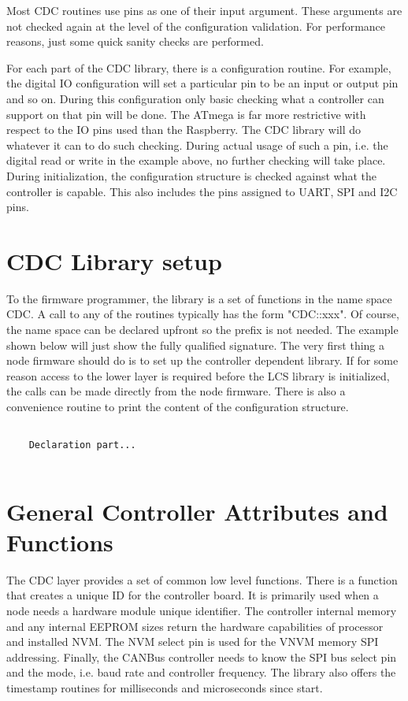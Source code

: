 Most CDC routines use pins as one of their input argument. These arguments are not checked again at the level of the configuration validation. For performance reasons, just some quick sanity checks are performed.

For each part of the CDC library, there is a configuration routine. For example, the digital IO configuration will set a particular pin to be an input or output pin and so on. During this configuration only basic checking what a controller can support on that pin will be done. The ATmega is far more restrictive with respect to the IO pins used than the Raspberry. The CDC library will do whatever it can to do such checking. During actual usage of such a pin, i.e. the digital read or write in the example above, no further checking will take place. During initialization, the configuration structure is checked against what the controller is capable. This also includes the pins assigned to UART, SPI and I2C pins.

\section{CDC Library setup}

To the firmware programmer, the library is a set of functions in the name space CDC. A call to any of the routines typically has the form "CDC::xxx". Of course, the name space can be declared upfront so the prefix is not needed. The example shown below will just show the fully qualified signature. The very first thing a node firmware should do is to set up the controller dependent library. If for some reason access to the lower layer is required before the LCS library is initialized, the calls can be made directly from the node firmware. There is also a convenience routine to print the content of the configuration structure.

\lstset{language=c++, style=codesnippetstyle}
\begin{lstlisting}
   
    Declaration part...
    
\end{lstlisting}
\FloatBarrier

\section{General Controller Attributes and Functions}

The CDC layer provides a set of common low level functions. There is a function that creates a unique ID for the controller board. It is primarily used when a node needs a hardware module unique identifier. The controller internal memory and any internal EEPROM sizes return the hardware capabilities of processor and installed NVM. The NVM select pin is used for the VNVM memory SPI addressing. Finally, the CANBus controller needs to know the SPI bus select pin and the mode, i.e. baud rate and controller frequency. The library also offers the timestamp routines for milliseconds and microseconds since start.

